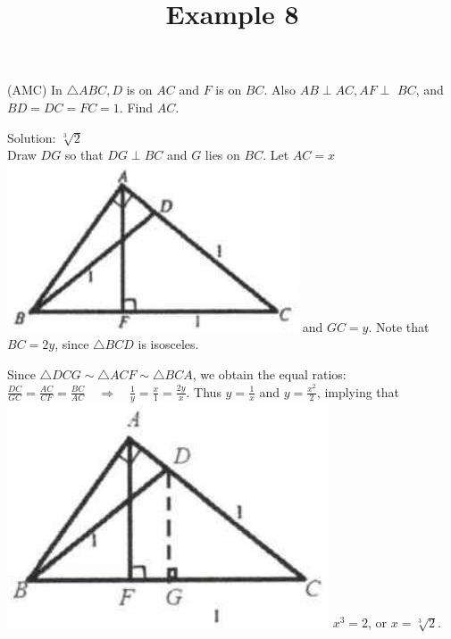 \documentclass{article}
\title{Example 8}
\date{}
\begin{document}
\maketitle

(AMC) In \(\triangle A B C, D\) is on \(A C\) and \(F\) is on \(B C\). Also \(A B \perp A C, A F \perp\) \(B C\), and \(B D=D C=F C=1\). Find \(A C\).

Solution: \(\sqrt[3]{2}\)\\
Draw \(D G\) so that \(D G \perp B C\) and \(G\) lies on \(B C\). Let \(A C=x\)\\
\includegraphics[width=\textwidth]{images/problem_image_1.jpg} and \(G C=y\). Note that \(B C=2 y\), since \(\triangle B C D\) is isosceles.


Since \(\triangle D C G \sim \triangle A C F \sim \triangle B C A\), we obtain the equal ratios: \(\frac{D C}{G C}=\frac{A C}{C F}=\frac{B C}{A C} \quad \Rightarrow \quad \frac{1}{y}=\frac{x}{1}=\frac{2 y}{x}\). Thus \(y=\frac{1}{x}\) and \(y=\frac{x^{2}}{2}\), implying that\\
\includegraphics[width=\textwidth]{images/reasoning_image_1.jpg} \(x^{3}=2\), or \(x=\sqrt[3]{2}\).
\end{document}
